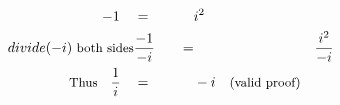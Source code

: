 \begin{alignat*}{5}
&\,&-1\quad&=\quad&&i^2\\
& &divide(-i)\small\text{ both sides}&\frac{-1}{-i}\quad&=&&\frac{i^2}{-i}\\
&\,&\small\text{Thus}\quad\frac{1}{i}\quad&=&&-i\quad\small\text{(valid proof)}
\end{alignat*}
